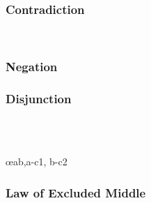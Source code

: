 \begin{multicols}{2}
\subsubsection*{Contradiction}

\begin{pf}

\\\have[ ]{}{\metaX}
\end{pf}


\subsubsection*{Negation}
\begin{pf}
\open
	\ellipsesline
\close
{}
\end{pf}



\subsubsection*{Disjunction}

\begin{pf}

\\	

\\	\open
		\ellipsesline
	\close
	\open
		\ellipsesline
	\close
	 \oe{ab,a-c1, b-c2}
\end{pf}

\subsubsection*{Law of Excluded Middle}
\begin{pf}
	\LEM
\end{pf}


\end{multicols}

\newpage
